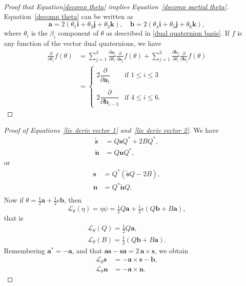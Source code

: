 \documentclass[reqno,12pt]{amsart}
\newcommand{\liederiv}{\mathcal L}
\begin{document}
\begin{proof}[Proof that Equation\eqref{decomp theta} implies Equation~\eqref{decomp partial theta}]
Equation~\eqref{decomp theta} can be written as
\begin{equation}
\bm a = 2(\theta_1 \bm i + \theta_2 \bm j + \theta_3 \bm k), \quad
\bm b = 2(\theta_4 \bm i + \theta_5 \bm j + \theta_6 \bm k),
\end{equation}
where $\theta_i$ is the $\beta_i$ component of $\theta$ as described in \eqref{dual quaternion basis}.  If $f$ is any function of the vector dual quaternions, we have
\begin{equation}
\begin{aligned}
\frac{\partial}{\partial \theta_i} f(\theta)
&= \sum_{j=1}^3 \frac{\partial \bm a_j}{\partial \theta_i} \frac{\partial}{\partial \bm a_j} f(\theta)
+ \sum_{j=1}^3 \frac{\partial \bm b_j}{\partial \theta_i} \frac{\partial}{\partial \bm b_j} f(\theta)
\\&
= \begin{cases}
2 \dfrac{\partial}{\partial \bm a_i} & \text{if $1 \le i \le 3$} \\ \\
2 \dfrac{\partial}{\partial \bm b_{i-3}} & \text{if $4 \le i \le 6$.}
\end{cases}
\end{aligned}
\end{equation}
\end{proof}

\begin{proof}[Proof of Equations~\eqref{lie deriv vector 1} and~\eqref{lie deriv vector 2}]
We have
\begin{align}
\tilde{\bm s} &= Q \bm s Q^* + 2 B Q^* , \\
\tilde{\bm n} &= Q \bm n Q^*,
\end{align}
or
\begin{align}
\bm s &= Q^* (\tilde{\bm s} Q - 2 B ) , \\
\bm n &= Q^* \tilde{\bm n} Q . \\
\end{align}
Now if $\theta = \tfrac12 \bm a + \tfrac12\epsilon\bm b$, then
\begin{equation}
\liederiv_\theta(\eta) = \eta\psi = \tfrac12 Q \bm a + \tfrac12 \epsilon (Q \bm b + B \bm a),
\end{equation}
that is
\begin{gather}
\liederiv_\theta(Q) = \tfrac12 Q \bm a, \\
\liederiv_\theta(B) = \tfrac12 (Q \bm b + B \bm a) .
\end{gather}
Remembering $\bm a^* = -\bm a$, and that $\bm a \bm s - \bm s \bm a = 2 \,\bm a \times \bm s$, we obtain
\begin{align}
\mathcal L_\theta \bm s &= -\bm a \times \bm s - \bm b ,\\
\mathcal L_\theta \bm n &= - \bm a \times \bm n .
\end{align}
\end{proof}
\end{document}
